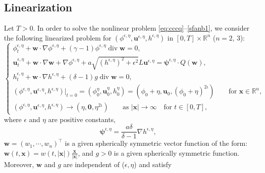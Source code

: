 \documentclass[11pt,reqno]{amsart}
\DeclareMathOperator{\diver}{\mathrm{div}}
\numberwithin{rk}{section}
\numberwithin{prop}{section}
\numberwithin{mydef}{section}
\numberwithin{lem}{section}
\numberwithin{equation}{section}
\numberwithin{thm}{section}
\begin{document}
\subsection{Linearization}
Let $T>0$. In order to solve the nonlinear problem  \eqref{eq:cccq}{\rm--}\eqref{sfanb1}, we consider the following  linearized problem for $(\phi^{\epsilon,\eta}, \boldsymbol{u}^{\epsilon,\eta},  h^{\epsilon,\eta})$  in $[0,T]\times \mathbb{R}^n$ ($n=2$, $3$):
\begin{equation}\label{ln}
\begin{cases}
\phi^{\epsilon,\eta}_t+\boldsymbol{w}\cdot\nabla\phi^{\epsilon,\eta}+(\gamma-1)\phi^{\epsilon,\eta} \diver\boldsymbol{w}=0,\\[3pt]
\boldsymbol{u}^{\epsilon,\eta}_t+\boldsymbol{w}\cdot \nabla \boldsymbol{w}+\nabla\phi^{\epsilon,\eta}+a \sqrt {(h^{\epsilon,\eta})^2+\epsilon^2} L\boldsymbol{u}^{\epsilon,\eta}=\boldsymbol{\psi}^{\epsilon,\eta} \cdot Q(\boldsymbol{w}),\\[3pt]
h^{\epsilon,\eta}_t+\boldsymbol{w}\cdot \nabla h^{\epsilon,\eta}+(\delta-1)g\diver\boldsymbol{w}=0,\\[3pt]
(\phi^{\epsilon,\eta},\boldsymbol{u}^{\epsilon,\eta},h^{\epsilon,\eta})|_{t=0}=(\phi^\eta_0,\boldsymbol{u}^\eta_0,h^\eta_0)=(\phi_0+\eta,\boldsymbol{u}_0,(\phi_0+\eta)^{2\iota})\qquad  \text{for $\boldsymbol{x}\in\mathbb{R}^n$},\\[3pt]
(\phi^{\epsilon,\eta},\boldsymbol{u}^{\epsilon,\eta},h^{\epsilon,\eta})\to (\eta,\boldsymbol{0},\eta^{2\iota}) \qquad \text{as $|\boldsymbol{x}|\to \infty$} \quad \text{for $t\in [0,T]$},
\end{cases}
\end{equation}
where $\epsilon$ and $\eta$ are  positive constants,
\begin{equation}\label{psih}
\boldsymbol{\psi}^{\epsilon,\eta}=\frac{a\delta}{\delta-1}\nabla h^{\epsilon,\eta},
\end{equation}
$\boldsymbol{w}=(w_1,\cdots\!,w_n)^{\top}$ is a given spherically symmetric vector function of the form: $
\boldsymbol{w}(t,\boldsymbol{x})=w(t,|\boldsymbol{x}|)\frac{\boldsymbol{x}}{|\boldsymbol{x}|}$,
and  $g>0$ is a given spherically symmetric  function. Moreover, $\boldsymbol{w}$ and $g$ are independent of ($\epsilon, \eta$) and satisfy  
\end{document}
